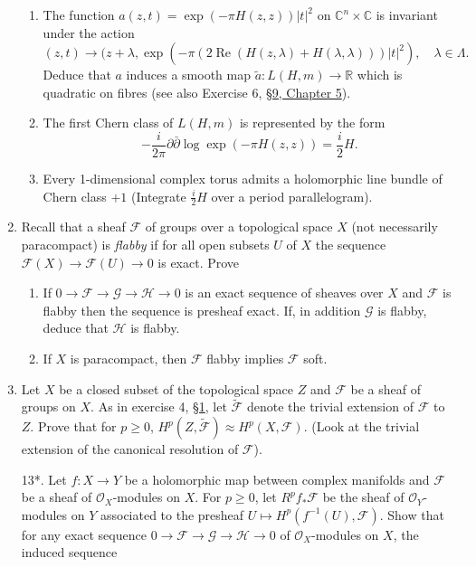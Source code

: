 \begin{enumerate}
\begin{enumerate}[label=\alph*)]
\item The function $a(z,t)=\exp(-\pi H(z,z))|t|^2$ on $\mathbb C^n\times\mathbb C$ is invariant under the action
\[
(z,t)\to(z+\lambda,\exp(-\pi(2\operatorname{Re}(H(z,\lambda)+H(\lambda,\lambda)))|t|^2),\quad\lambda\in\Lambda.
\]
Deduce that $a$ induces a smooth map $\widetilde a:L(H,m)\to\mathbb R$ which is quadratic on fibres (see also Exercise 6, \hyperref[sec:5:9]{\S9, Chapter 5}).
\item The first Chern class of $L(H,m)$ is represented by the form
\[
-\frac i{2\pi}\partial\bar\partial\log\exp(-\pi H(z,z))=\frac i2 H.
\]
\item Every 1-dimensional complex torus admits a holomorphic line bundle of Chern class $+1$ (Integrate $\frac i2H$ over a period parallelogram).
\end{enumerate}
\item Recall that a sheaf $\mathcal F$ of groups over a topological space $X$ (not necessarily paracompact) is \emph{flabby} if for all open subsets $U$ of $X$ the sequence $\mathcal F(X)\to\mathcal F(U)\to0$ is exact. Prove
\begin{enumerate}[label=\alph*)]
\item If $0\to\mathcal F\to\mathcal G\to\mathcal H\to0$ is an exact sequence of sheaves over $X$ and $\mathcal F$ is flabby then the sequence is presheaf exact. If, in addition $\mathcal G$ is flabby, deduce that $\mathcal H$ is flabby.
\item If $X$ is paracompact, then $\mathcal F$ flabby implies $\mathcal F$ soft.
\end{enumerate}
\item Let $X$ be a closed subset of the topological space $Z$ and $\mathcal F$ be a sheaf of groups on $X$. As in exercise 4, \hyperref[sec:6:1]{\S1}, let $\widetilde{\mathcal F}$ denote the trivial extension of $\mathcal F$ to $Z$. Prove that for $p\geq0$, $H^p(Z,\widetilde{\mathcal F})\approx H^p(X,\mathcal F)$. (Look at the trivial extension of the canonical resolution of $\mathcal F$).
\item[13*.] Let $f:X\to Y$ be a holomorphic map between complex manifolds and $\mathcal F$ be a sheaf of $\mathcal O_X$-modules on $X$. For $p\geq0$, let $R^pf_*\mathcal F$ be the sheaf of $\mathcal O_Y$-modules on $Y$ associated to the presheaf $U\mapsto H^p(f^{-1}(U),\mathcal F)$. Show that for any exact sequence $0\to\mathcal F\to\mathcal G\to\mathcal H\to0$ of $\mathcal O_X$-modules on $X$, the induced sequence

\end{enumerate}
